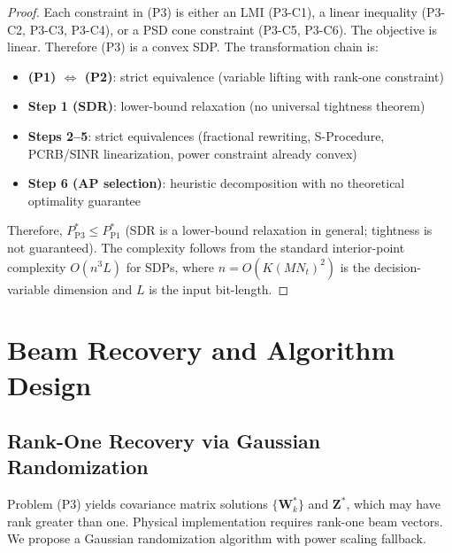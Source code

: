 \documentclass[12pt,a4paper]{article}
\newcommand{\mat}[1]{\mathbf{#1}}
\begin{document}
\begin{proof}
Each constraint in (P3) is either an LMI (P3-C1), a linear inequality (P3-C2, P3-C3, P3-C4), or a PSD cone constraint (P3-C5, P3-C6). The objective is linear. Therefore (P3) is a convex SDP. The transformation chain is:
\begin{itemize}
    \item \textbf{(P1) $\Leftrightarrow$ (P2)}: strict equivalence (variable lifting with rank-one constraint)
    \item \textbf{Step 1 (SDR)}: lower-bound relaxation (no universal tightness theorem)
    \item \textbf{Steps 2--5}: strict equivalences (fractional rewriting, S-Procedure, PCRB/SINR linearization, power constraint already convex)
    \item \textbf{Step 6 (AP selection)}: heuristic decomposition with no theoretical optimality guarantee
\end{itemize}
Therefore, $P_{\text{P3}}^* \leq P_{\text{P1}}^*$ (SDR is a lower-bound relaxation in general; tightness is not guaranteed). The complexity follows from the standard interior-point complexity $O(n^3 L)$ for SDPs, where $n = O(K(MN_t)^2)$ is the decision-variable dimension and $L$ is the input bit-length.
\end{proof}

\section{Beam Recovery and Algorithm Design}

\subsection{Rank-One Recovery via Gaussian Randomization}

Problem (P3) yields covariance matrix solutions $\{\mat{W}_k^*\}$ and $\mat{Z}^*$, which may have rank greater than one. Physical implementation requires rank-one beam vectors. We propose a Gaussian randomization algorithm with power scaling fallback.
\end{document}
